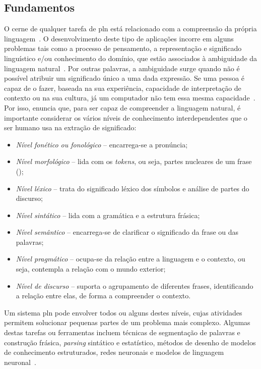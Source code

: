 \subsection{Fundamentos}
O cerne de qualquer tarefa de \gls{pln} está relacionado com a compreensão da própria linguagem~\parencite{nlp}. O desenvolvimento deste tipo de aplicações incorre em alguns problemas tais como a processo de pensamento, a representação e significado linguístico e/ou conhecimento do domínio, que estão associados à ambiguidade da linguagem natural~\parencite{nlp, pln_extracao_conhecimento}. Por outras palavras, a ambiguidade surge quando não é possível atribuir um significado único a uma dada expressão. Se uma pessoa é capaz de o fazer, baseada na sua experiência, capacidade de interpretação de contexto ou na sua cultura, já um computador não tem essa mesma capacidade~\parencite{pln_extracao_conhecimento}. Por isso, \textcite{nlp} enuncia que, para ser capaz de compreender a linguagem natural, é importante considerar os vários níveis de conhecimento interdependentes que o ser humano usa na extração de significado:

\begin{itemize}
    \item 
    {
        \textit{Nível fonético ou fonológico} -- encarrega-se a pronúncia;
    }
    \item
    {
        \textit{Nível morfológico} -- lida com os \textit{tokens}, ou seja, partes nucleares de um frase ();
    }
    \item
    {
        \textit{Nível léxico} -- trata do significado léxico dos símbolos e análise de partes do discurso;
    }
    \item 
    {
        \textit{Nível sintático} -- lida com a gramática e a estrutura frásica;
    }
    \item
    {
        \textit{Nível semântico} -- encarrega-se de clarificar o significado da frase ou das palavras;
    }
    \item
    {
        \textit{Nível pragmático} -- ocupa-se da relação entre a linguagem e o contexto, ou seja, contempla a relação com o mundo exterior;
    }
    \item
    {
        \textit{Nível de discurso} -- suporta o agrupamento de diferentes frases, identificando a relação entre elas, de forma a compreender o contexto.
    }
\end{itemize}

Um sistema \gls{pln} pode envolver todos ou alguns destes níveis, cujas atividades permitem solucionar pequenas partes de um problema mais complexo. Algumas destas tarefas ou ferramentas incluem técnicas de segmentação de palavras e construção frásica, \textit{parsing} sintático e estatístico, métodos de desenho de modelos de conhecimento estruturados, redes neuronais e modelos de linguagem neuronal~\parencite{nlp, speech_language_processing}.

